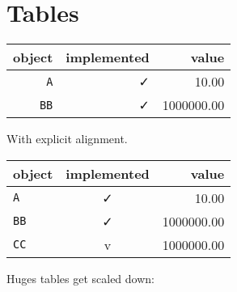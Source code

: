 \section{Tables}



\label{6147076236960597988}{}



\begin{table}[h]
\centering
\begin{tabulary}{\linewidth}{R R R}
\toprule
object & implemented & value \\
\toprule
\texttt{A} & ✓ & 10.00 \\
\texttt{BB} & ✓ & 1000000.00 \\
\bottomrule
\end{tabulary}

\end{table}



With explicit alignment.




\begin{table}[h]
\centering
\begin{tabulary}{\linewidth}{L C R}
\toprule
object & implemented & value \\
\toprule
\texttt{A} & ✓ & 10.00 \\
\texttt{BB} & ✓ & 1000000.00 \\
\texttt{CC} & v & 1000000.00 \\
\bottomrule
\end{tabulary}

\end{table}



Huges tables get scaled down:




